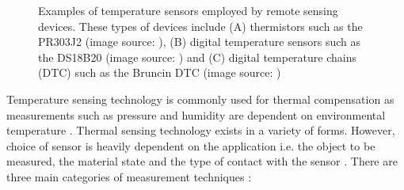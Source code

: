 \begin{figure}[H]
	\centering
	\begin{subfigure}[b]{0.3\textwidth}
	\end{subfigure}%
	\hfill
	\begin{subfigure}[b]{0.3\textwidth}
	\end{subfigure}%
	\hfill
	\begin{subfigure}[b]{0.3\textwidth}
	\end{subfigure}%
	\hfill
	\caption{Examples of temperature sensors employed by remote sensing devices. These types of devices include (A) thermistors such as the PR303J2 (image source: \cite{pr303J2}), (B) digital temperature sensors such as the DS18B20 (image source: \cite{ds18b20}) and (C) digital temperature chains (DTC) such as the Bruncin DTC (image source: \cite{bruncindtc}) } 
	\label{fig:temp_examples}
\end{figure}

Temperature sensing technology is commonly used for thermal compensation as measurements such as pressure and humidity are dependent on environmental temperature \cite{mansoor2015silicon}. Thermal sensing technology exists in a variety of forms. However, choice of sensor is heavily dependent on the application i.e. the object to be measured, the material state and the type of contact with the sensor \cite{mansoor2015silicon,childs2000review}. There are three main categories of measurement techniques \cite{childs2000review}:

